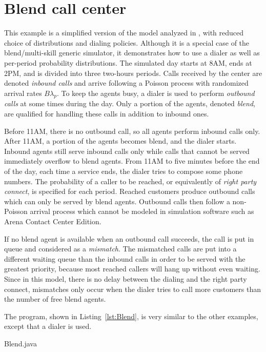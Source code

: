 \section{Blend call center}
\label{sec:Blend}

This example is a simplified version of the model analyzed in
\cite{ccDES03a}, with reduced choice of distributions and dialing
policies.  Although it is a special case of the blend/multi-skill
generic simulator, it demonstrates how to use a dialer as well as
per-period probability distributions.
The simulated day starts at 8AM, ends at 2PM, and is
divided into three two-hours periods.
Calls received by the center are denoted \emph{inbound calls} and
arrive
following a Poisson process with randomized arrival rates
$B\lambda_p$.  To keep the
agents busy, a dialer is used to perform \emph{outbound calls} at some
times during the day.  Only a portion of the agents, denoted
\emph{blend}, are
qualified for handling these calls in addition to inbound ones.

Before 11AM, there is no outbound call, so all agents perform
inbound calls only.  After 11AM, a
portion of the agents becomes blend, and the dialer starts.
Inbound agents still serve inbound calls only while calls that cannot
be served immediately overflow to blend agents.
From 11AM to five minutes before the end of the day,
each time a service ends, the dialer tries to compose some phone
numbers.  The probability of a caller to be reached, or equivalently
of \emph{right party connect}, is specified for
each period.
Reached customers produce outbound calls which can only be served
by blend agents.  Outbound calls
then follow a non-Poisson arrival process which cannot be modeled in
simulation software such as Arena Contact Center Edition.

If no blend agent is
available when an outbound call succeeds,
the call is put in queue and considered as a
\emph{mismatch}.  The mismatched calls are put into a different
waiting queue
than the inbound calls in order to be served with the greatest
priority, because most reached callers will hang up without
even waiting.
Since in this model, there is no delay between the dialing and the
right party connect, mismatches only occur when the dialer tries to
call more customers than the number of free blend agents.

The program, shown in Listing~\ref{lst:Blend}, is very similar to the
other examples, except that a
dialer is used.


{Blend.java}

